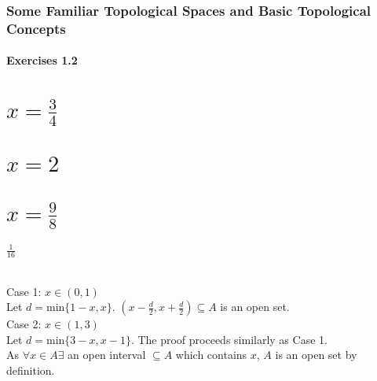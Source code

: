 \section{Some Familiar Topological Spaces and Basic Topological Concepts}

\subsection{Exercises 1.2}



\begin{parts}
 
 \part{$x = \frac{3}{4}$}
 \part{$x = 2$}
 \part{$x = \frac{9}{8}$}
 
\begin{solution}
 $\frac{1}{16}$
\end{solution}

\end{parts}


\begin{solution}
\\Case 1: $x \in (0,1)$ \\
Let $d = \text{min}\{1-x,x\}$. $(x-\frac{d}{2},x+\frac{d}{2}) \subseteq A$ is an open set. \\
Case 2: $x \in (1,3)$ \\
Let $d = \text{min}\{3-x,x-1\}$. The proof proceeds similarly as Case 1. \\
As $\forall x \in A \exists$ an open interval $\subseteq A$ which contains $x$, $A$ is an open set by definition.
\end{solution}


